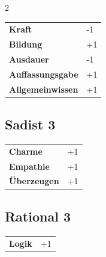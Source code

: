 \begin{multicols}{2}
\begin{tcolorbox}
\begin{tabular}{@{}ll@{}}
    \textbf{Kraft} & -1\\
    \textbf{Bildung} & +1\\
    \textbf{Ausdauer} & -1\\
    \textbf{Auffassungsgabe} & +1\\
    \textbf{Allgemeinwissen} & +1\\
\end{tabular}


\end{tcolorbox}

\begin{tcolorbox}
    \subsection*{Sadist \hfill \small{3 }}
    \tcblower




\begin{tabular}{@{}ll@{}}
    \textbf{Charme} & +1\\
    \textbf{Empathie} & +1\\
    \textbf{Überzeugen} & +1\\
\end{tabular}


\end{tcolorbox}

\begin{tcolorbox}
    \subsection*{Rational \hfill \small{3 }}
    \tcblower




\begin{tabular}{@{}ll@{}}
    \textbf{Logik} & +1\\
\end{tabular}



\end{tcolorbox}
\end{multicols}
